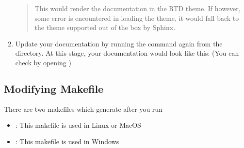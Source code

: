 \documentclass[letterpaper,10pt,english]{sphinxmanual}
\let\sphinxpxdimen\pdfpxdimen\else\newdimen\sphinxpxdimen
\begin{document}
\begin{enumerate}
\begin{quote}
\begin{sphinxVerbatim}[commandchars=\\\{\}]
     
      
      \PYG{p}{[}\PYG{p}{]}
      \PYG{p}{[}\PYG{p}{]}
      
\end{sphinxVerbatim}

\sphinxAtStartPar
This would render the documentation in the RTD theme.
If however, some error is encountered in loading the theme, it would fall back to the  theme supported out of the box by Sphinx.
\end{quote}

\item {} 
\sphinxAtStartPar
Update your documentation by running the  command again from the  directory.
At this stage, your documentation would look like this: (You can check by opening )
\begin{quote}

\begin{figure}[htbp]
\centering

\noindent\sphinxincludegraphics[width=1920\sphinxpxdimen,height=1080\sphinxpxdimen]{{indepth_doc_stage2}.png}
\end{figure}
\end{quote}

\end{enumerate}


\subsection{Modifying Makefile}
\label{\detokenize{usage:modifying-makefile}}
\sphinxAtStartPar
There are two makefiles which generate after you run 
\begin{itemize}
\item {} 
\sphinxAtStartPar
{}: This makefile is used in Linux or MacOS

\item {} 
\sphinxAtStartPar
{}: This makefile is used in Windows

\end{itemize}
\end{document}
